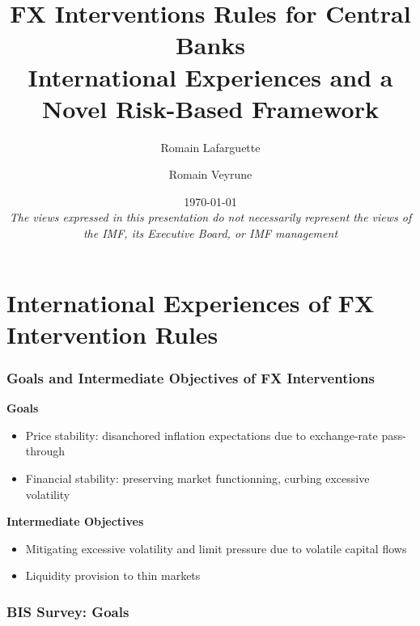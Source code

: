 \documentclass{beamer}
\title[]{FX Interventions Rules for Central Banks\\
International Experiences and a Novel Risk-Based Framework}
\author[]{Romain Lafarguette \and Romain Veyrune}
\institute[]{IMF Monetary and Capital Markets Department \\ Central Bank Operations Division}
\date[]{\scriptsize \today \\ \vspace{0.5cm} \scriptsize{\textit{The views
      expressed in this presentation do not necessarily represent the views of
      the IMF, its Executive Board, or IMF management} \vspace{-0.75cm}}}
\begin{document}
\begingroup
\renewcommand{\insertframenumber}{}
\begin{frame}
\maketitle
\end{frame}
\endgroup


\section{International Experiences of FX Intervention Rules}
\begin{frame}
  \frametitle{Goals and Intermediate Objectives of FX Interventions}

  \textbf{Goals}
  \begin{itemize}
  \item Price stability: disanchored inflation expectations due to
    exchange-rate pass-through
  \item Financial stability: preserving market functionning, curbing excessive volatility
  \end{itemize}

\bigskip
  
  \textbf{Intermediate Objectives}
  \begin{itemize}
  \item Mitigating excessive volatility and limit pressure due to volatile
    capital flows
  \item Liquidity provision to thin markets
  \end{itemize}
   
\end{frame}


\begin{frame}
  \frametitle{BIS Survey: Goals}
\end{frame}
\end{document}
